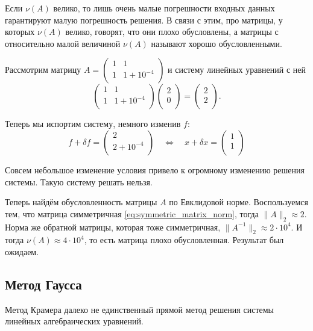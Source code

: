 \documentclass{article}
\begin{document}
Если $\nu(A)$ велико, то лишь очень малые погрешности входных данных гарантируют
малую погрешность решения. В связи с этим, про матрицы, у которых $\nu(A)$
велико, говорят, что они плохо обусловлены, а матрицы с относительно малой
величиной $\nu(A)$ называют хорошо обусловленными.

\begin{example}
	Рассмотрим матрицу
	$A=
		\begin{pmatrix}
			1	& 1 \\
			1	& 1+10^{-4} \\
		\end{pmatrix}
	$
	и систему линейных уравнений с ней
	\[
		\begin{pmatrix}
			1	& 1 \\
			1	& 1+10^{-4} \\
		\end{pmatrix}
		\begin{pmatrix}
			2 \\
			0 \\
		\end{pmatrix}
		=
		\begin{pmatrix}
			2 \\
			2 \\
		\end{pmatrix}
		.
	\]

	Теперь мы испортим систему, немного изменив $f$:
	\[f+\delta f=
		\begin{pmatrix}
			2 \\
			2+10^{-4} \\
		\end{pmatrix}
		\quad\Leftrightarrow\quad
		x+\delta x=
		\begin{pmatrix}
			1 \\
			1 \\
		\end{pmatrix}
	\]

	Совсем небольшое изменение условия привело к огромному изменению
	решения системы. Такую систему решать нельзя.

	Теперь найдём обусловленность матрицы $A$ по Евклидовой норме.
	Воспользуемся тем, что матрица симметричная
	\eqref{eq:symmetric_matrix_norm}, тогда $\|A\|_2\approx 2$.
	Норма же обратной матрицы, которая тоже симметричная,
	$\|A^{-1}\|_2\approx 2\cdot 10^4$. И тогда $\nu(A)\approx
	4\cdot 10^4$, то есть матрица плохо обусловленная. Результат был
	ожидаем.
\end{example}

\subsection{Метод Гаусса}
Метод Крамера далеко не единственный прямой метод решения системы линейных
алгебраических уравнений.
\end{document}
